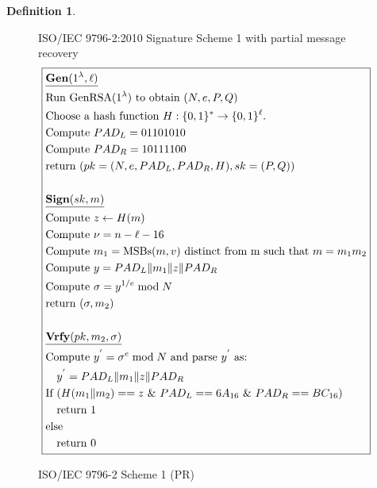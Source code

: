 \documentclass[]{final_report}
\theoremstyle{definition}
\newtheorem{definition}{Definition}[chapter]
\begin{document}
\begin{definition}
\begin{figure}[H]
\centering
\hfill ISO/IEC 9796-2:2010 Signature Scheme 1 with partial message recovery\hfill\phantom{} 
\[
\boxed{
\begin{aligned}
&\underline{\textbf{\text{Gen}} (1^\lambda, \ell)} \\
&\text{Run GenRSA}(1^\lambda) \text{ to obtain } (N, e, P, Q) \\
&\text{Choose a hash function } H : \{0, 1\}^* \rightarrow \{0, 1\}^\ell. \\
&\text{Compute } PAD_{L} = 01101010 \\
&\text{Compute } PAD_{R} = 10111100 \\
&\text{return } (pk = (N, e, PAD_{L}, PAD_{R}, H), sk = (P, Q)) \\
\\
&\underline{\textbf{\text{Sign}} (sk, m)} \\
&\text{Compute } z \leftarrow H(m) \\
&\text{Compute } \nu = n - \ell - 16 \\
&\text{Compute } m_{1} = \text{MSBs}(m, v) \text{ distinct from m such that } m = m_{1} m_{2} \\
&\text{Compute } y = PAD_{L} \| m_{1} \| z \| PAD_{R} \\
&\text{Compute } \sigma = y^{1/e} \bmod N \\
&\text{return } (\sigma, m_{2}) \\
\\
&\underline{\textbf{\text{Vrfy}} (pk, m_{2}, \sigma)} \\
&\text{Compute } y^{'} = \sigma^{e} \bmod N \text{ and parse } y^{'} \text{ as: } \\
&\quad y^{'} = PAD_{L} \| m_{1} \| z \| PAD_{R} \\
&\text{If } (H(m_{1} \| m_{2}) == z  \text{ } \& \text{ } PAD_{L} == 6A_{16} \text{ } \& \text{ } PAD_{R} == BC_{16}) \\
&\quad \text{return } 1 \\
&\text{else} \\
&\quad \text{return } 0 
\end{aligned}
}
\]
\caption{ISO/IEC 9796-2 Scheme 1 (PR)}
\label{fig:isoiec9796}
\end{figure}
\end{definition}
\end{document}
